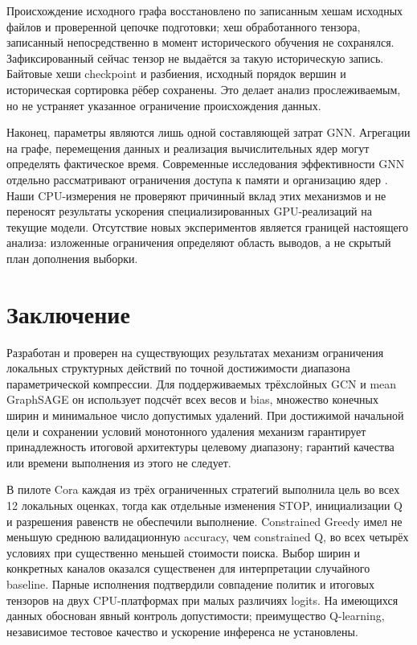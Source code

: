 \documentclass[10pt,a4paper]{article}
\begin{document}
Происхождение исходного графа восстановлено по записанным хешам исходных файлов и проверенной цепочке подготовки; хеш обработанного тензора, записанный непосредственно в момент исторического обучения не сохранялся. Зафиксированный сейчас тензор не выдаётся за такую историческую запись. Байтовые хеши checkpoint и разбиения, исходный порядок вершин и историческая сортировка рёбер сохранены. Это делает анализ прослеживаемым, но не устраняет указанное ограничение происхождения данных.

Наконец, параметры являются лишь одной составляющей затрат GNN. Агрегации на графе, перемещения данных и реализация вычислительных ядер могут определять фактическое время. Современные исследования эффективности GNN отдельно рассматривают ограничения доступа к памяти и организацию ядер \cite{r15}. Наши CPU-измерения не проверяют причинный вклад этих механизмов и не переносят результаты ускорения специализированных GPU-реализаций на текущие модели. Отсутствие новых экспериментов является границей настоящего анализа: изложенные ограничения определяют область выводов, а не скрытый план дополнения выборки.

\section*{Заключение}
Разработан и проверен на существующих результатах механизм ограничения локальных структурных действий по точной достижимости диапазона параметрической компрессии. Для поддерживаемых трёхслойных GCN и mean GraphSAGE он использует подсчёт всех весов и bias, множество конечных ширин и минимальное число допустимых удалений. При достижимой начальной цели и сохранении условий монотонного удаления механизм гарантирует принадлежность итоговой архитектуры целевому диапазону; гарантий качества или времени выполнения из этого не следует.

В пилоте Cora каждая из трёх ограниченных стратегий выполнила цель во всех 12 локальных оценках, тогда как отдельные изменения STOP, инициализации Q и разрешения равенств не обеспечили выполнение. Constrained Greedy имел не меньшую среднюю валидационную accuracy, чем constrained Q, во всех четырёх условиях при существенно меньшей стоимости поиска. Выбор ширин и конкретных каналов оказался существенен для интерпретации случайного baseline. Парные исполнения подтвердили совпадение политик и итоговых тензоров на двух CPU-платформах при малых различиях logits. На имеющихся данных обоснован явный контроль допустимости; преимущество Q-learning, независимое тестовое качество и ускорение инференса не установлены.
\end{document}
